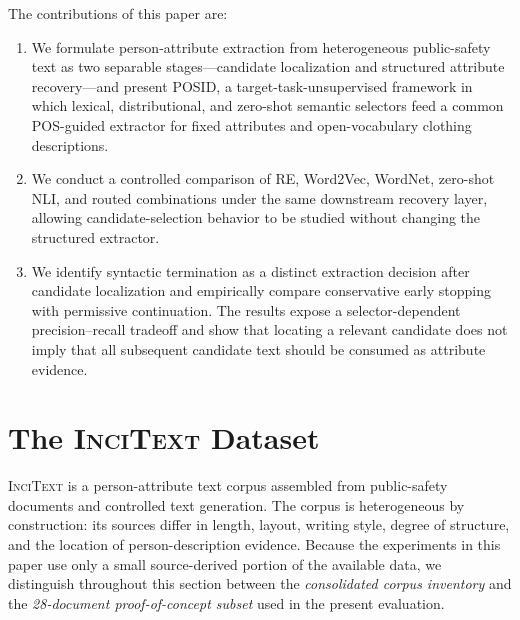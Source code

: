 \documentclass[sigconf,nonacm]{acmart}
\newcommand{\posid}{\textsc{POSID}}
\newcommand{\incitext}{\textsc{InciText}}
\begin{document}
The contributions of this paper are:
\begin{enumerate}[leftmargin=*,itemsep=2pt,topsep=3pt]
    \item We formulate person-attribute extraction from heterogeneous
    public-safety text as two separable stages---candidate localization and
    structured attribute recovery---and present \posid{}, a
    target-task-unsupervised framework in which lexical, distributional, and
    zero-shot semantic selectors feed a common POS-guided extractor for fixed
    attributes and open-vocabulary clothing descriptions.

    \item We conduct a controlled comparison of RE, Word2Vec, WordNet,
    zero-shot NLI, and routed combinations under the same downstream recovery
    layer, allowing candidate-selection behavior to be studied without changing
    the structured extractor.

    \item We identify syntactic termination as a distinct extraction decision
    after candidate localization and empirically compare conservative early
    stopping with permissive continuation. The results expose a
    selector-dependent precision--recall tradeoff and show that locating a
    relevant candidate does not imply that all subsequent candidate text should
    be consumed as attribute evidence.
\end{enumerate}


\section{The \incitext{} Dataset}
\label{sec:dataset}

\incitext{} is a person-attribute text corpus assembled from public-safety
documents and controlled text generation. The corpus is heterogeneous by
construction: its sources differ in length, layout, writing style, degree of
structure, and the location of person-description evidence. Because the
experiments in this paper use only a small source-derived portion of the
available data, we distinguish throughout this section between the
\emph{consolidated corpus inventory} and the \emph{28-document
proof-of-concept subset} used in the present evaluation.
\end{document}
